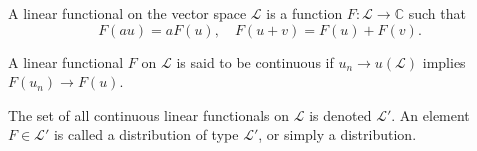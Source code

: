 A linear functional on the vector space $\mathcal{L}$ is a function $F: \mathcal{L} \to \mathbb{C}$ such that
$$F(au) = aF(u), \quad F(u + v) = F(u) + F(v).$$

A linear functional $F$ on $\mathcal{L}$ is said to be continuous if $u_n \to u (\mathcal{L})$ implies $F(u_n) \to F(u)$.

The set of all continuous linear functionals on $\mathcal{L}$ is denoted $\mathcal{L}'$. An element $F \in \mathcal{L}'$ is called a distribution of type $\mathcal{L}'$, or simply a distribution.
